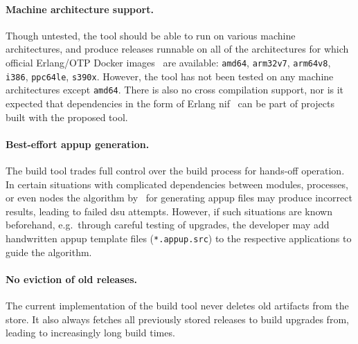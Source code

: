 \paragraph{Machine architecture support.} Though untested, the tool should be able to run on various machine architectures, and produce releases runnable on all of the architectures for which official Erlang/OTP Docker images~\cite{docker:erlang} are available: \lstinline|amd64|, \lstinline|arm32v7|, \lstinline|arm64v8|, \lstinline|i386|, \lstinline|ppc64le|, \lstinline|s390x|. However, the tool has not been tested on any machine architectures except \lstinline|amd64|. There is also no cross compilation support, nor is it expected that dependencies in the form of Erlang \acrfull{nif}~\cite{doc:otp} can be part of projects built with the proposed tool.

\paragraph{Best-effort \acrshort{appup} generation.} The build tool trades full control over the build process for hands-off operation. In certain situations with complicated dependencies between modules, processes, or even nodes the algorithm by~\cite{rebar3appup}
for generating \acrfull{appup} files may produce incorrect results, leading to failed \acrshort{dsu} attempts. However, if such situations are known beforehand, e.g.~through careful testing of upgrades, the developer may add handwritten \acrshort{appup} template files (\lstinline|*.appup.src|) to the respective applications to guide the algorithm.

\paragraph{No eviction of old releases.} The current implementation of the build tool never deletes old artifacts from the store. It also always fetches all previously stored releases to build upgrades from, leading to increasingly long build times.
